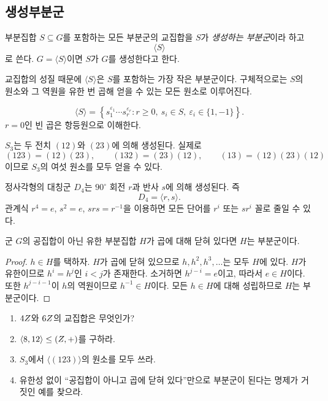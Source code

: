 \subsection{생성부분군}

\begin{definition}[생성부분군]
부분집합 $S\subseteq G$를 포함하는 모든 부분군의 교집합을 $S$가 \emph{생성하는 부분군}이라 하고
\[
  \langle S\rangle
\]
로 쓴다. $G=\langle S\rangle$이면 $S$가 $G$를 생성한다고 한다.
\end{definition}

교집합의 성질 때문에 $\langle S\rangle$은 $S$를 포함하는 가장 작은 부분군이다. 구체적으로는 $S$의 원소와 그 역원을 유한 번 곱해 얻을 수 있는 모든 원소로 이루어진다.

\begin{proposition}
\[
\langle S\rangle
=
\left\{s_1^{\varepsilon_1}\cdots s_r^{\varepsilon_r}:
 r\ge0,\ s_i\in S,\ \varepsilon_i\in\{1,-1\}\right\}.
\]
$r=0$인 빈 곱은 항등원으로 이해한다.
\end{proposition}

\begin{example}
$S_3$는 두 전치 $(12)$와 $(23)$에 의해 생성된다. 실제로
\[
  (123)=(12)(23),\qquad
  (132)=(23)(12),\qquad
  (13)=(12)(23)(12)
\]
이므로 $S_3$의 여섯 원소를 모두 얻을 수 있다.
\end{example}

\begin{example}
정사각형의 대칭군 $D_4$는 $90^\circ$ 회전 $r$과 반사 $s$에 의해 생성된다. 즉
\[
  D_4=\langle r,s\rangle.
\]
관계식 $r^4=e$, $s^2=e$, $srs=r^{-1}$을 이용하면 모든 단어를 $r^i$ 또는 $sr^i$ 꼴로 줄일 수 있다.
\end{example}

\begin{proposition}
군 $G$의 공집합이 아닌 유한 부분집합 $H$가 곱에 대해 닫혀 있다면 $H$는 부분군이다.
\end{proposition}

\begin{proof}
$h\in H$를 택하자. $H$가 곱에 닫혀 있으므로 $h,h^2,h^3,\dots$는 모두 $H$에 있다. $H$가 유한이므로 $h^i=h^j$인 $i<j$가 존재한다. 소거하면 $h^{j-i}=e$이고, 따라서 $e\in H$이다. 또한 $h^{j-i-1}$이 $h$의 역원이므로 $h^{-1}\in H$이다. 모든 $h\in H$에 대해 성립하므로 $H$는 부분군이다.
\end{proof}

\begin{checkpoint}
\begin{enumerate}[label=\arabic*.]
  \item $4Z$와 $6Z$의 교집합은 무엇인가?
  \item $\langle 8,12\rangle\le(Z,+)$를 구하라.
  \item $S_3$에서 $\langle(123)\rangle$의 원소를 모두 쓰라.
  \item 유한성 없이 ``공집합이 아니고 곱에 닫혀 있다''만으로 부분군이 된다는 명제가 거짓인 예를 찾으라.
\end{enumerate}
\end{checkpoint}
